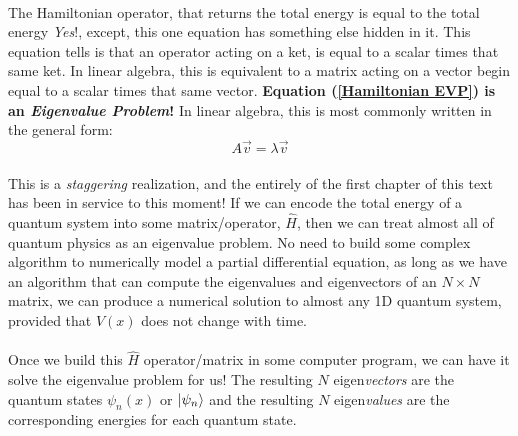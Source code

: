 \documentclass[12pt,letterpaper]{book}
\begin{document}
\paragraph*{}The Hamiltonian operator, that returns the total energy is equal to the total energy \textit{Yes}!, except, this one equation has something else hidden in it. This equation tells is that an operator acting on a ket, is equal to a scalar times that same ket. In linear algebra, this is equivalent to a matrix acting on a vector begin equal to a scalar times that same vector. \textbf{Equation (\ref{Hamiltonian EVP}) is an \textit{Eigenvalue Problem}!} In linear algebra, this is most commonly written in the general form:
\begin{equation}
A\vec{v} = \lambda \vec{v}
\end{equation}
\paragraph*{}This is a \textit{staggering} realization, and the entirely of the first chapter of this text has been in service to this moment! If we can encode the total energy of a quantum system into some matrix/operator, $\hat{H}$, then we can treat almost all of quantum physics as an eigenvalue problem. No need to build some complex algorithm to numerically model a partial differential equation, as long as we have an algorithm that can compute the eigenvalues and eigenvectors of an $N \times N$ matrix, we can produce a numerical solution to almost any 1D quantum system, provided that $V(x)$ does not change with time.
\paragraph*{}Once we build this $\hat{H}$ operator/matrix in some computer program, we can have it solve the eigenvalue problem for us! The resulting $N$ eigen\textit{vectors} are the quantum states $\psi_n(x)$ or $\ket{\psi_n}$ and the resulting $N$ eigen\textit{values} are the corresponding energies for each quantum state.
\end{document}
